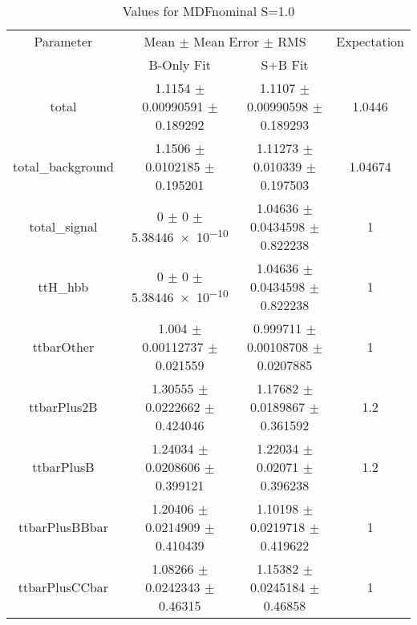 \begin{table}
\centering
\caption{Values for MDFnominal S=1.0}
\begin{tabular}{cccc}
\toprule
Parameter & \multicolumn{2}{c}{Mean $\pm$ Mean Error $\pm$ RMS} & Expectation\\
 & B-Only Fit & S+B Fit & \\
\midrule
total & \num{1.1154} $\pm$ \num{0.00990591} $\pm$ \num{0.189292} & \num{1.1107} $\pm$ \num{0.00990598} $\pm$ \num{0.189293} & \num{1.0446}\\
total\_background & \num{1.1506} $\pm$ \num{0.0102185} $\pm$ \num{0.195201} & \num{1.11273} $\pm$ \num{0.010339} $\pm$ \num{0.197503} & \num{1.04674}\\
total\_signal & \num{0} $\pm$ \num{0} $\pm$ \num{5.38446e-10} & \num{1.04636} $\pm$ \num{0.0434598} $\pm$ \num{0.822238} & \num{1}\\
ttH\_hbb & \num{0} $\pm$ \num{0} $\pm$ \num{5.38446e-10} & \num{1.04636} $\pm$ \num{0.0434598} $\pm$ \num{0.822238} & \num{1}\\
ttbarOther & \num{1.004} $\pm$ \num{0.00112737} $\pm$ \num{0.021559} & \num{0.999711} $\pm$ \num{0.00108708} $\pm$ \num{0.0207885} & \num{1}\\
ttbarPlus2B & \num{1.30555} $\pm$ \num{0.0222662} $\pm$ \num{0.424046} & \num{1.17682} $\pm$ \num{0.0189867} $\pm$ \num{0.361592} & \num{1.2}\\
ttbarPlusB & \num{1.24034} $\pm$ \num{0.0208606} $\pm$ \num{0.399121} & \num{1.22034} $\pm$ \num{0.02071} $\pm$ \num{0.396238} & \num{1.2}\\
ttbarPlusBBbar & \num{1.20406} $\pm$ \num{0.0214909} $\pm$ \num{0.410439} & \num{1.10198} $\pm$ \num{0.0219718} $\pm$ \num{0.419622} & \num{1}\\
ttbarPlusCCbar & \num{1.08266} $\pm$ \num{0.0242343} $\pm$ \num{0.46315} & \num{1.15382} $\pm$ \num{0.0245184} $\pm$ \num{0.46858} & \num{1}\\
\bottomrule
\end{tabular}
\end{table}